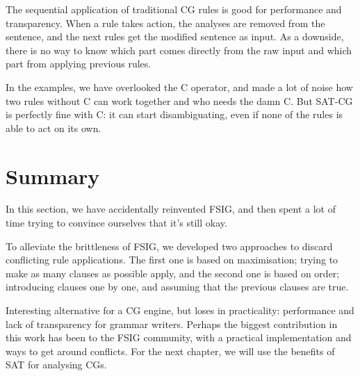 


The sequential application of traditional CG rules is good for
performance and transparency. When a rule takes action, the analyses
are removed from the sentence, and the next rules get the modified
sentence as input. 
As a downside, there is no way to know which part comes directly from the
raw input and which part from applying previous rules.

In the examples, we have overlooked the C operator, and made a lot of noise how two rules without C can work together and who needs the damn C.
But SAT-CG is perfectly fine with C: it can start disambiguating, even if none of the rules is able to act on its own. 





\section{Summary}

In this section, we have accidentally reinvented FSIG, and then spent a lot of time trying to convince ourselves that it's still okay.

To alleviate the brittleness of FSIG, we developed two approaches to discard conflicting rule applications.
The first one is based on maximisation; trying to make as many clauses as possible apply, and the second one is based on order; introducing clauses one by one, and assuming that the previous clauses are true.

Interesting alternative for a CG engine, but loses in practicality: performance and lack of transparency for grammar writers.
Perhaps the biggest contribution in this work has been to the FSIG community, with a practical implementation and ways to get around conflicts.
For the next chapter, we will use the benefits of SAT for analysing CGs.






